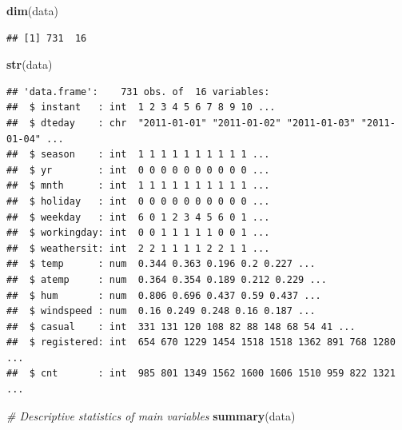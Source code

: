 \documentclass[
]{article}
\newenvironment{Shaded}{\begin{snugshade}}{\end{snugshade}}
\newcommand{\CommentTok}[1]{\textcolor[rgb]{0.56,0.35,0.01}{\textit{#1}}}
\newcommand{\FunctionTok}[1]{\textcolor[rgb]{0.13,0.29,0.53}{\textbf{#1}}}
\newcommand{\NormalTok}[1]{#1}
\begin{document}
\begin{Shaded}
\begin{Highlighting}[]
\FunctionTok{dim}\NormalTok{(data)}
\end{Highlighting}
\end{Shaded}

\begin{verbatim}
## [1] 731  16
\end{verbatim}

\begin{Shaded}
\begin{Highlighting}[]
\FunctionTok{str}\NormalTok{(data)}
\end{Highlighting}
\end{Shaded}

\begin{verbatim}
## 'data.frame':    731 obs. of  16 variables:
##  $ instant   : int  1 2 3 4 5 6 7 8 9 10 ...
##  $ dteday    : chr  "2011-01-01" "2011-01-02" "2011-01-03" "2011-01-04" ...
##  $ season    : int  1 1 1 1 1 1 1 1 1 1 ...
##  $ yr        : int  0 0 0 0 0 0 0 0 0 0 ...
##  $ mnth      : int  1 1 1 1 1 1 1 1 1 1 ...
##  $ holiday   : int  0 0 0 0 0 0 0 0 0 0 ...
##  $ weekday   : int  6 0 1 2 3 4 5 6 0 1 ...
##  $ workingday: int  0 0 1 1 1 1 1 0 0 1 ...
##  $ weathersit: int  2 2 1 1 1 1 2 2 1 1 ...
##  $ temp      : num  0.344 0.363 0.196 0.2 0.227 ...
##  $ atemp     : num  0.364 0.354 0.189 0.212 0.229 ...
##  $ hum       : num  0.806 0.696 0.437 0.59 0.437 ...
##  $ windspeed : num  0.16 0.249 0.248 0.16 0.187 ...
##  $ casual    : int  331 131 120 108 82 88 148 68 54 41 ...
##  $ registered: int  654 670 1229 1454 1518 1518 1362 891 768 1280 ...
##  $ cnt       : int  985 801 1349 1562 1600 1606 1510 959 822 1321 ...
\end{verbatim}

\begin{Shaded}
\begin{Highlighting}[]
\CommentTok{\# Descriptive statistics of main variables}
\FunctionTok{summary}\NormalTok{(data)}
\end{Highlighting}
\end{Shaded}
\end{document}

